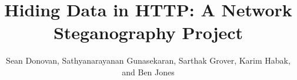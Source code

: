 \documentclass{acmsmall}
\begin{document}

\title{Hiding Data in HTTP: A Network Steganography Project}
\author{Sean Donovan, Sathyanarayanan Gunasekaran, Sarthak Grover, Karim Habak, and Ben Jones}
\maketitle





%



\nocite{Ref1,Ref2,Ref3,Ref4,Ref5,Ref6,Ref7,Ref8,Ref9,Ref10,Ref12,Ref13,Ref14,Ref15 }



\end{document}
